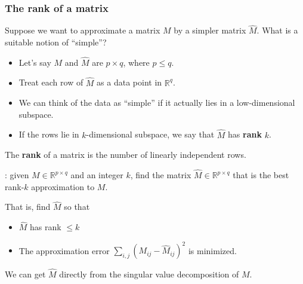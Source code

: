 \documentclass[smaller,handout]{beamer}
\def\R{{\mathbb R}}
\def\darkred{\color{red!70!black}}
\def\vone{{\vskip.1in}}
\def\v2{{\vskip.2in}}
\def\R{{\mathbb R}}
\begin{document}

\begin{frame}
\frametitle{The rank of a matrix}

{\darkred Suppose we want to approximate a matrix $M$ by a simpler matrix $\widehat{M}$. What is a suitable notion of ``simple''?}
\pause
\begin{itemize}
\item Let's say $M$ and $\widehat{M}$ are $p \times q$, where $p \leq q$.
\item Treat each row of $\widehat{M}$ as a data point in $\R^q$.
\item We can think of the data as ``simple'' if it actually lies in a low-dimensional subspace.
\item If the rows lie in $k$-dimensional subspace, we say that $\widehat{M}$ has {\bf rank} $k$.
\end{itemize}
\pause
\alert{The {\bf rank} of a matrix is the number of linearly independent rows.}

\pause\v2
{\darkred {\bf Low-rank approximation}: given $M \in \R^{p \times q}$ and an integer $k$, find the matrix $\widehat{M} \in \R^{p \times q}$ that is the best rank-$k$ approximation to $M$.} 

\pause\vone
That is, find $\widehat{M}$ so that
\begin{itemize}
\item $\widehat{M}$ has rank $\leq k$
\item The approximation error
$ \sum_{i,j} (M_{ij} - \widehat{M}_{ij})^2$
is minimized.
\end{itemize}

\pause
\alert{We can get $\widehat{M}$ directly from the singular value decomposition of $M$.}
\end{frame}
\end{document}
